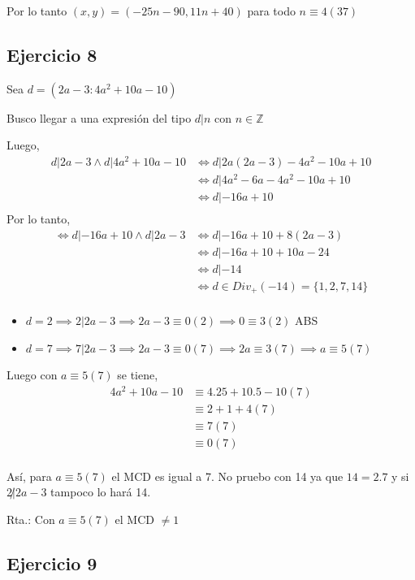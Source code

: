 Por lo tanto $ (x, y) = (-25n-90, 11n+40) $ para todo $ n \equiv 4(37) $

\subsection{Ejercicio 8}

Sea $ d = (2a-3:4a^2+10a-10) $

Busco llegar a una expresión del tipo $ d|n $ con $ n \in \mathbb{Z} $

Luego,
\begin{align*}
    d|2a-3 \wedge d|4a^2+10a-10 &\iff d|2a(2a-3) - 4a^2-10a+10 \\
    &\iff d|4a^2-6a-4a^2-10a+10 \\
    &\iff d|-16a+10 \\
\end{align*}
Por lo tanto,
\begin{align*}
    \iff d|-16a+10 \wedge d|2a-3 &\iff d|-16a+10+8(2a-3) \\
    &\iff d|-16a+10+10a-24 \\
    &\iff d|-14 \\
    &\iff d \in Div_+(-14) = \{ 1,2,7,14 \} \\
\end{align*}
\begin{itemize}
    \item $ d = 2 \implies 2|2a-3 \implies 2a-3 \equiv 0(2) \implies 0\equiv 3(2) $ ABS
    \item $ d = 7 \implies 7|2a-3 \implies 2a-3 \equiv 0(7) \implies 2a\equiv 3(7) \implies a \equiv 5(7) $
\end{itemize}

Luego con $ a \equiv 5(7) $ se tiene,
\begin{align*}
    4a^2+10a-10 &\equiv 4.25+10.5-10 (7) \\
    &\equiv 2+1+4 (7) \\
    &\equiv 7 (7) \\
    &\equiv 0 (7) \\
\end{align*}

Así, para $ a \equiv 5(7) $ el MCD es igual a 7. No pruebo con 14 ya que $ 14=2.7 $ y si $ 2\not | 2a-3 $ tampoco lo hará 14.

Rta.: Con $ a \equiv 5(7) $ el MCD $ \neq 1 $

\subsection{Ejercicio 9}

